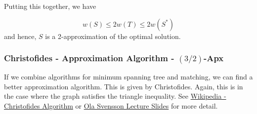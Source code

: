 Putting this together, we have

\[w(S) \leq 2w(T) \leq 2 w(S^*)\]
and hence, $S$ is a 2-approximation of the optimal solution.


\subsubsection{Christofides - Approximation Algorithm - $(3/2)$-Apx}
If we combine algorithms for minimum spanning tree and matching, we can find a better approximation algorithm.  This is given by Christofides.  Again, this is in the case where the graph satisfies the triangle inequality.  See 
\href{https://en.wikipedia.org/wiki/Christofides_algorithm}{Wikipedia - Christofides Algorithm} or \href{https://resources.mpi-inf.mpg.de/conferences/adfocs-15/material/Ola-Lect1.pdf}{Ola Svensson Lecture Slides} for more detail.

%